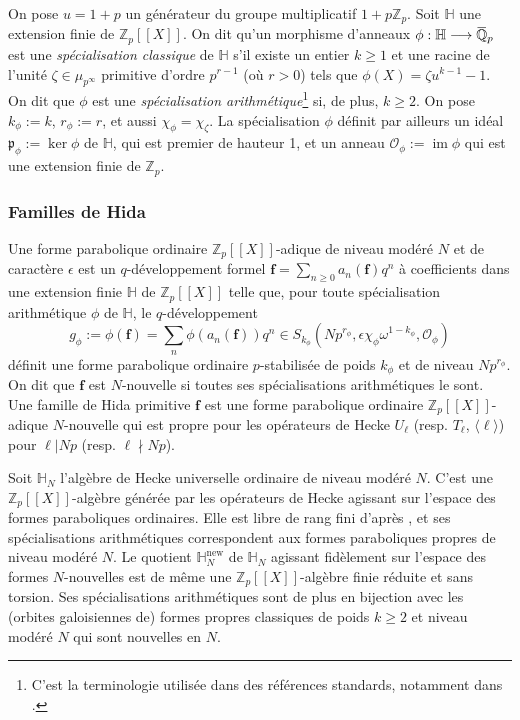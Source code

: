 \documentclass[12pt]{amsart}
\newcommand\bQ{\mathbb{Q}}
\newcommand\bH{\mathbb{H}}
\newcommand\Zp{{\mathbb{Z}_{p}}}
\newcommand\cO{\mathcal{O}}
\newcommand\gp{\mathfrak{p}}
\newcommand{\ob}[1]{\mkern 1.5mu\overline{\mkern-1.5mu#1\mkern-1.5mu}\mkern 1.5mu}
\DeclareMathOperator{\im}{im}
\theoremstyle{defstyle}
\theoremstyle{thmstyle}
\begin{document}
On pose $u=1+p$ un générateur du groupe multiplicatif $1+p\Zp$. Soit $\bH$ une extension finie de $\Zp[[X]]$. On dit qu'un morphisme d'anneaux $\phi:\bH \longrightarrow \ob{\bQ}_p$ est une \textit{spécialisation classique} de $\bH$ s'il existe un entier $k\geq 1$ et une racine de l'unité $\zeta \in \mu_{p^\infty}$ primitive d'ordre $p^{r-1}$ (où $r>0$) tels que $\phi(X)=\zeta u^{k-1} -1$. On dit que $\phi$ est une \textit{spécialisation arithmétique}\footnote{C'est la terminologie utilisée dans des références standards, notamment dans \cite{ghatevatsal}.} si, de plus, $k\geq 2$. On pose $k_\phi:=k$, $r_\phi:=r$, et aussi $\chi_\phi= \chi_\zeta$. La spécialisation $\phi$ définit par ailleurs un idéal $\gp_\phi:=\ker \phi$ de $\bH$, qui est premier de hauteur 1, et un anneau $\cO_{\phi}:= \im \phi$ qui est une extension finie de $\Zp$. 

\subsubsection{Familles de Hida} 
Une forme parabolique ordinaire $\Zp[[X]]$-adique de niveau modéré $N$ et de caractère $\epsilon$ est un $q$-développement formel $\textbf{f}=\sum_{n\geq 0} a_n(\textbf{f})q^n$ à coefficients dans une extension finie $\bH$ de $\Zp[[X]]$ telle que, pour toute spécialisation arithmétique $\phi$ de $\bH$, le $q$-développement
$$g_\phi:=\phi(\textbf{f})= \sum_n \phi(a_n(\textbf{f}))q^n \in S_{k_\phi}(Np^{r_\phi},\epsilon \chi_{\phi} \omega^{1-k_\phi},\cO_{\phi})$$
définit une forme parabolique ordinaire $p$-stabilisée de poids $k_\phi$ et de niveau $Np^{r_\phi}$. On dit que $\textbf{f}$ est $N$-nouvelle si toutes ses spécialisations arithmétiques le sont. Une famille de Hida primitive $\textbf{f}$ est une forme parabolique ordinaire $\Zp[[X]]$-adique $N$-nouvelle qui est propre pour les opérateurs de Hecke $U_\ell$ (resp. $T_\ell$, $\langle \ell \rangle$) pour $\ell|Np$ (resp. $\ell\nmid Np$). 


Soit $\bH_N$ l'algèbre de Hecke universelle ordinaire de niveau modéré $N$. C'est une $\Zp[[X]]$-algèbre générée par les opérateurs de Hecke agissant sur l'espace des formes paraboliques ordinaires. Elle est libre de rang fini d'après \cite[Theorem 3.1]{hida1986iwasawa}, et ses spécialisations arithmétiques correspondent aux formes paraboliques propres de niveau modéré $N$. Le quotient $\bH_N^\textrm{new}$ de $\bH_N$ agissant fidèlement sur l'espace des formes $N$-nouvelles est de même une $\Zp[[X]]$-algèbre finie réduite et sans torsion. Ses spécialisations arithmétiques sont de plus en bijection avec les (orbites galoisiennes de) formes propres classiques de poids $k\geq 2$ et niveau modéré $N$ qui sont nouvelles en $N$. 
\end{document}
